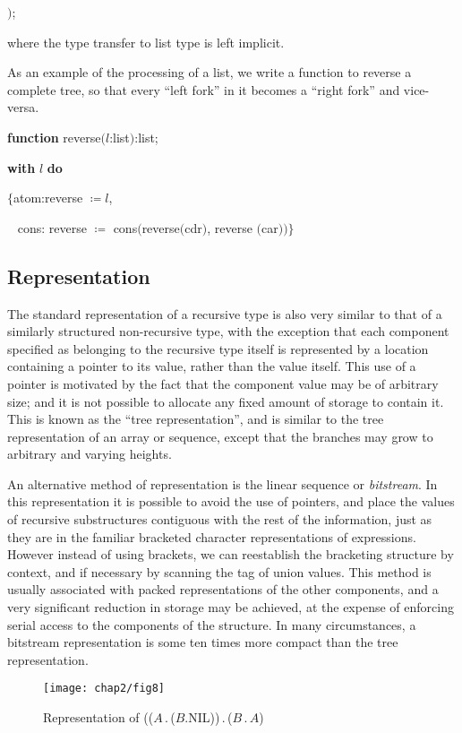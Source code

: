 \tabto{4.8em} $)$;

\noindent
where the type transfer to list type is left implicit.

As an example of the processing of a list, we write a function to reverse a complete tree, so that every ``left fork'' in it becomes a ``right fork'' and vice-versa.

\quad \textbf{function} reverse$(l$:list$)$:list;

\quad \quad \textbf{with} $l$ \textbf{do}

\quad \quad \quad $\{$atom:reverse $\coloneq l$,

\quad \quad \quad ~ cons: reverse $\coloneq$ cons$($reverse$($cdr$)$, reverse $($car$))\}$

\subsection{Representation}

The standard representation of a recursive type is also very similar to that of a similarly structured non-recursive type, with the exception that each component specified as belonging to the recursive type itself is represented by a location containing a pointer to its value, rather than the value itself. This use of a pointer is motivated by the fact that the component value may be of arbitrary size; and it is not possible to allocate any fixed amount of storage to contain it. This is known as the ``tree representation'', and is similar to the tree representation of an array or sequence, except that the branches may grow to arbitrary and varying heights.

An alternative method of representation is the linear sequence or \textit{bitstream}. In this representation it is possible to avoid the use of pointers, and place the values of recursive substructures contiguous with the rest of the information, just as they are in the familiar bracketed character representations of expressions. However instead of using brackets, we can reestablish the bracketing structure by context, and if necessary by scanning the tag of union values. This method is usually associated with packed representations of the other components, and a very significant reduction in storage may be achieved, at the expense of enforcing serial access to the components of the structure. In many circumstances, a bitstream representation is some ten times more compact than the tree representation.

\begin{figure}[h]
	\centering
	\texttt{[image: chap2/fig8]}
	\caption{Representation of (($A$\,.\,($B$.NIL))\,.\,($B$\,.\,$A$)}
\end{figure}


